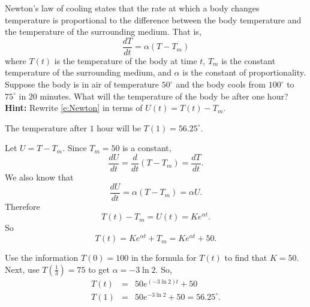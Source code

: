 \documentclass{ximera}
\begin{document}
\begin{exercise} \label{c3.1.5} 
Newton's law of cooling states that the rate at which a body changes
temperature is proportional to the difference between the body
temperature and the temperature of the surrounding medium.  That is,
\begin{equation}  \label{e:Newton}
\frac{dT}{dt} = \alpha(T-T_m)
\end{equation}
where $T(t)$ is the temperature of the body at time $t$, $T_m$ is the
constant temperature of the surrounding medium, and $\alpha$ is the
constant of proportionality.  Suppose the
body is in air of temperature $50^\circ$ and the body cools from
$100^\circ$ to $75^\circ$ in $20$ minutes.  What will the temperature
of the body be after one hour?  {\bf Hint:} Rewrite \eqref{e:Newton} in
terms of $U(t) = T(t) - T_m$.

\begin{solution}

\ans The temperature after $1$ hour will be $T(1) = 56.25^{\circ}$.

\soln Let $U = T - T_m$.  Since $T_m = 50$ is a constant,
\[
\frac{dU}{dt} = \frac{d}{dt}(T - T_m) = \frac{dT}{dt}.
\]
We also know that
\[
\frac{dU}{dt} = \alpha (T - T_m) = \alpha U. \]
Therefore \[ T(t) - T_m = U(t) = Ke^{\alpha t}. \]
So \[ T(t) = Ke^{\alpha t} + T_m = Ke^{\alpha t} + 50. \]

Use the information $T(0) = 100$ in the formula for $T(t)$ to find that
$K = 50$.  Next, use $T(\frac{1}{3}) = 75$ to get $\alpha = -3\ln{2}$. So,
\[
\begin{array}{rcl}
T(t) & = & 50e^{(-3\ln{2})t} + 50 \\
T(1) & = & 50e^{-3\ln{2}} + 50 = 56.25^{\circ}.\end{array}
\]

\end{solution}
\end{exercise}
\end{document}
